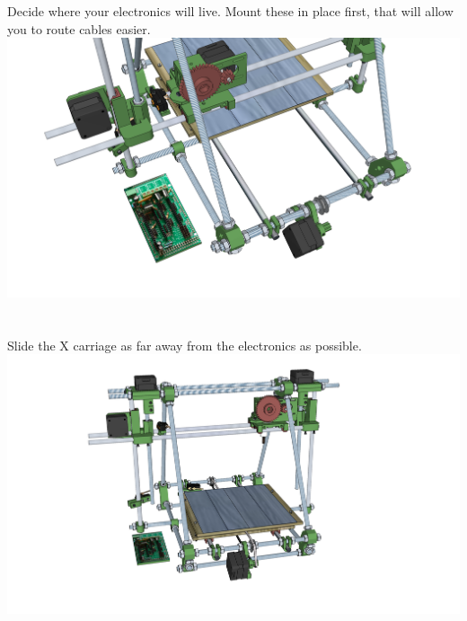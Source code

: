 \documentclass[twoside,openany,a4paper,titlepage]{memoir}
\begin{document}
	\section{}
	Decide where your electronics will live. Mount these in place first, that will allow you to route cables
	easier.\\
	\includegraphics[width=1\linewidth]{graphics/ch10_10.png}
	
	\section{}
	Slide the X carriage as far away from the electronics as possible.\\
	\includegraphics[width=1\linewidth]{graphics/ch10_11.png}
	
\end{document}

